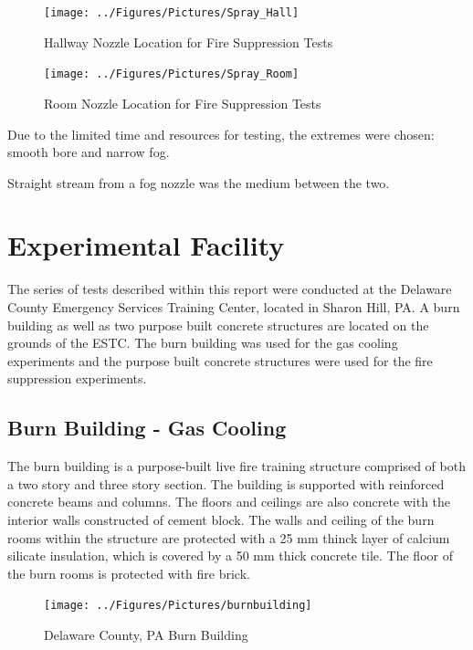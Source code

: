 \documentclass[12pt,oneside]{book}
\begin{document}
\begin{figure}[!ht]
	\texttt{[image: ../Figures/Pictures/Spray\_Hall]}
	\caption{Hallway Nozzle Location for Fire Suppression Tests}
	\label{fig:Hallway_Nozzle_Location_Fire_Suppression_Tests}
\end{figure}

\begin{figure}[!ht]
	\texttt{[image: ../Figures/Pictures/Spray\_Room]}
	\caption{Room Nozzle Location for Fire Suppression Tests}
	\label{fig:Room_Nozzle_Location_Fire_Suppression_Tests}
\end{figure}

Due to the limited time and resources for testing, the extremes were chosen: smooth bore and narrow fog.

Straight stream from a fog nozzle was the medium between the two.

\section{Experimental Facility}
\label{sec:Experimental_Facility}

The series of tests described within this report were conducted at the Delaware County Emergency Services Training Center, located in Sharon Hill, PA. A burn building as well as two purpose built concrete structures are located on the grounds of the ESTC. The burn building was used for the gas cooling experiments and the purpose built concrete structures were used for the fire suppression experiments.   

\subsection{Burn Building - Gas Cooling}
\label{sec:Burn_Building}

The burn building is a purpose-built live fire training structure comprised of both a two story and three story section. The building is supported with reinforced concrete beams and columns.  The floors and ceilings are also concrete with the interior walls constructed of cement block. The walls and ceiling of the burn rooms within the structure are protected with a 25 mm thinck layer of calcium silicate insulation, which is covered by a 50 mm thick concrete tile. The floor of the burn rooms is protected with fire brick.

\begin{figure}[!ht]
	\texttt{[image: ../Figures/Pictures/burnbuilding]}
	\caption{Delaware County, PA Burn Building}
	\label{fig:Delaware_County,_PA_Burn_Building}
\end{figure}
\end{document}
